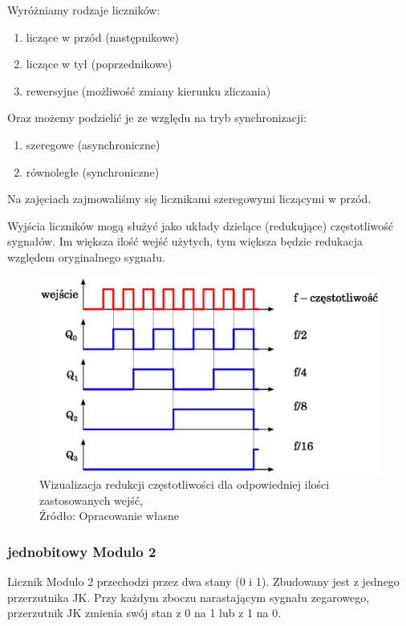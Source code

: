 \documentclass{article}
\begin{document}
      Wyróżniamy rodzaje liczników:
      \begin{enumerate}
        \item  liczące w przód (następnikowe)
        \item  liczące w tył (poprzednikowe)
        \item rewersyjne (możliwość zmiany kierunku zliczania)
      \end{enumerate}
      
      Oraz możemy podzielić je ze względu na tryb synchronizacji:
      \begin{enumerate}
        \item szeregowe (asynchroniczne)
        \item równoległe (synchroniczne)
      \end{enumerate}
      Na zajęciach zajmowaliśmy się licznikami szeregowymi liczącymi w przód.

      Wyjścia liczników mogą służyć jako układy dzielące (redukujące) częstotliwość sygnałów. Im większa ilość wejść użytych, tym większa będzie redukacja względem oryginalnego sygnału.

      \begin{figure}[!ht]
        \centering
        \includegraphics[scale=0.55]{grafiki/Licznik_freq.eps}
        \caption{Wizualizacja redukcji częstotliwości dla odpowiedniej ilości zastosowanych wejść,
        \\Źródło: Opracowanie własne}
        \label{fig1:freq}
      \end{figure}

      \subsubsection{jednobitowy Modulo 2}
        Licznik Modulo 2 przechodzi przez dwa stany (0 i 1). Zbudowany jest z jednego przerzutnika JK. Przy każdym zboczu narastającym sygnału zegarowego, przerzutnik JK zmienia swój stan z 0 na 1 lub z 1 na 0.
        
\end{document}
